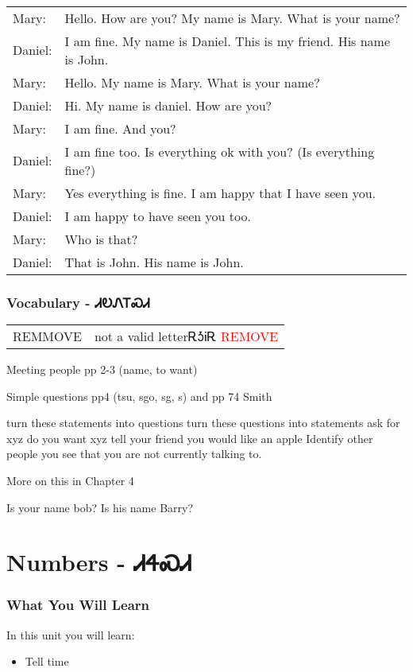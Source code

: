 {{\begin{tabular}{p{2cm} p{11cm}}
\end{tabular}
\\
\\
\\
\noindent\begin{tabular}{p{2cm} p{11cm}}Mary: & Hello.  How are you?  My name is Mary.  What is your name?\\
Daniel: & I am fine.  My name is Daniel.  This is my friend.  His name is John.\\
Mary: & Hello.  My name is Mary.  What is your name?\\
Daniel: & Hi.  My name is daniel.  How are you?\\
Mary: & I am fine.  And you?\\
Daniel: & I am fine too.  Is everything ok with you? (Is everything fine?)\\
Mary: & Yes everything is fine.  I am happy that I have seen you.\\
Daniel: & I am happy to have seen you too.\\
Mary: & Who is that?\\
Daniel: & That is John.  His name is John.\\
\end{tabular}
\subsection{Vocabulary - ᏗᎧᏁᎢᏍᏗ 
}
\begin{tabular}{p{3cm} p{11cm}}
REMMOVE & not a valid letterᎡᎼᎥᎡ 
 \newline \textcolor{red}{REMOVE}\\
\end{tabular}


    Meeting people pp 2-3 (name, to want)

    Simple questions pp4 (tsu, sgo, sg, s) and pp 74 Smith

    turn these statements into questions
    turn these questions into statements
    ask for xyz
    do you want xyz
    tell your friend you would like an apple
    Identify other people you see that you are not currently talking to.

    More on this in Chapter 4

    Is your name bob?
    Is his name Barry?
\chapter{Numbers - ᏗᏎᏍᏗ}
\subsection{What You Will Learn}
In this unit you will learn:
\begin{itemize}
\item Tell time
\end{itemize}\newpage

}}
